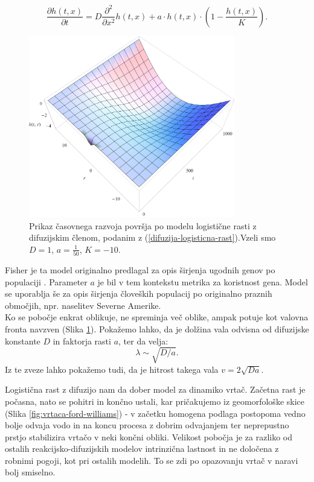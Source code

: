 \documentclass[a4paper, twoside, 12pt]{book}
\begin{document}
    \begin{equation}
      \frac{ \partial h(t,x) }{ \partial t} = D \frac{\partial^2}{\partial x^2} h(t,x) + a \cdot h(t,x) \cdot (1 - \frac{h(t,x)}{K}).
      \label{difuzija-logisticna-rast}
    \end{equation}
    \begin{figure}[h!]
      \begin{center}
        \includegraphics[width=9cm]{slike/difuzija-logisticna-rast2}
      \end{center}
      \caption{Prikaz časovnega razvoja površja po modelu logistične rasti z difuzijskim členom, podanim z (\ref{difuzija-logisticna-rast}).Vzeli smo $D=1$, $a=\frac{1}{50}$, $K=-10$.}
      \label{fig:difuzija-logisticna-rast}
    \end{figure}

Fisher je ta model originalno predlagal za opis širjenja ugodnih genov po populaciji \cite{broadbridge2002huxley}. Parameter $a$ je bil v tem kontekstu metrika za koristnost gena. Model se uporablja še za opis širjenja človeških populacij po originalno praznih območjih, npr. naselitev Severne Amerike.\\

Ko se pobočje enkrat oblikuje, ne spreminja več oblike, ampak potuje kot valovna fronta navzven (Slika \ref{fig:difuzija-logisticna-rast}). Pokažemo lahko, da je dolžina vala odvisna od difuzijske konstante $D$ in faktorja rasti $a$, ter da velja: 
    \[ \lambda \sim \sqrt{D/a}. \]
Iz te zveze lahko pokažemo tudi, da je hitrost takega vala $v = 2 \sqrt{D a}$.

Logistična rast z difuzijo nam da dober model za dinamiko vrtač. Začetna rast je počasna, nato se pohitri in končno ustali, kar pričakujemo iz geomorfološke skice (Slika \ref{fig:vrtaca-ford-williams}) - v začetku homogena podlaga postopoma vedno bolje odvaja vodo in na koncu procesa z dobrim odvajanjem ter neprepustno prstjo stabilizira vrtačo v neki končni obliki.
Velikost pobočja je za razliko od ostalih reakcijsko-difuzijskih modelov intrinzična lastnost in ne določena z robnimi pogoji, kot pri ostalih modelih. To se zdi po opazovanju vrtač v naravi bolj smiselno.
\end{document}

